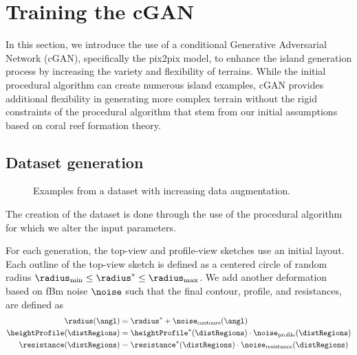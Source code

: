 \section{Training the cGAN}

In this section, we introduce the use of a conditional Generative Adversarial Network (cGAN), specifically the pix2pix model, to enhance the island generation process by increasing the variety and flexibility of terrains. While the initial procedural algorithm can create numerous island examples, cGAN provides additional flexibility in generating more complex terrain without the rigid constraints of the procedural algorithm that stem from our initial assumptions based on coral reef formation theory.

\subsection{Dataset generation}
\label{sec:coral-island_dataset-generation}


\begin{figure}
	\centering
    \caption{Examples from a dataset with increasing data augmentation.}
    \label{fig:coral-island_cGAN-examples}
\end{figure}


The creation of the dataset is done through the use of the procedural algorithm for which we alter the input parameters. 

For each generation, the top-view and profile-view sketches use an initial layout. Each outline of the top-view sketch is defined as a centered circle of random radius $\radius_\text{min} \leq \radius^* \leq \radius_\text{max}$. We add another deformation based on fBm noise $\noise$ such that the final contour, profile, and resistances, are defined as 
\begin{align}
    \radius(\angl) &= \radius^* + \noise_{\text{contours}}(\angl) \nonumber \\
    \heightProfile(\distRegions) &= \heightProfile^*(\distRegions) \cdot \noise_{\text{profile}}(\distRegions) \nonumber \\
    \resistance(\distRegions) &= \resistance^*(\distRegions) \cdot \noise_{\text{resistance}}(\distRegions) \nonumber
\end{align}

